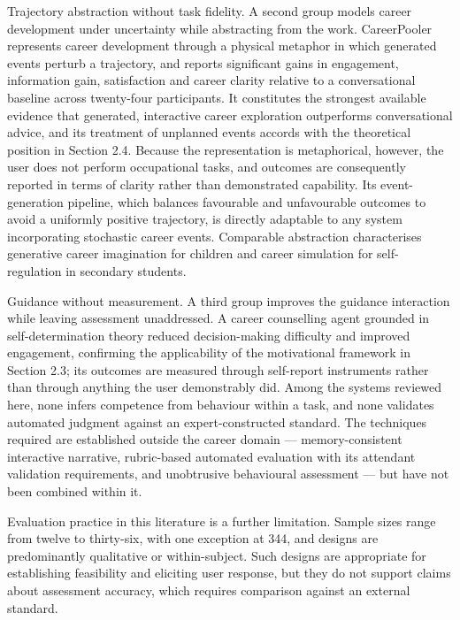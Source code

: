 Trajectory abstraction without task fidelity. A second group models career development under uncertainty while abstracting from the work. CareerPooler\cite{r79} represents career development through a physical metaphor in which generated events perturb a trajectory, and reports significant gains in engagement, information gain, satisfaction and career clarity relative to a conversational baseline across twenty-four participants. It constitutes the strongest available evidence that generated, interactive career exploration outperforms conversational advice, and its treatment of unplanned events accords with the theoretical position in Section 2.4. Because the representation is metaphorical, however, the user does not perform occupational tasks, and outcomes are consequently reported in terms of clarity rather than demonstrated capability. Its event-generation pipeline, which balances favourable and unfavourable outcomes to avoid a uniformly positive trajectory, is directly adaptable to any system incorporating stochastic career events. Comparable abstraction characterises generative career imagination for children\cite{r80} and career simulation for self-regulation in secondary students\cite{r81}.

Guidance without measurement. A third group improves the guidance interaction while leaving assessment unaddressed. A career counselling agent grounded in self-determination theory\cite{r82} reduced decision-making difficulty and improved engagement, confirming the applicability of the motivational framework in Section 2.3; its outcomes are measured through self-report instruments rather than through anything the user demonstrably did. Among the systems reviewed here, none infers competence from behaviour within a task, and none validates automated judgment against an expert-constructed standard. The techniques required are established outside the career domain --- memory-consistent interactive narrative\cite{r53,r56}, rubric-based automated evaluation with its attendant validation requirements\cite{r57,r59,r60}, and unobtrusive behavioural assessment\cite{r75} --- but have not been combined within it.

Evaluation practice in this literature is a further limitation. Sample sizes range from twelve to thirty-six, with one exception at 344, and designs are predominantly qualitative or within-subject. Such designs are appropriate for establishing feasibility and eliciting user response, but they do not support claims about assessment accuracy, which requires comparison against an external standard.

